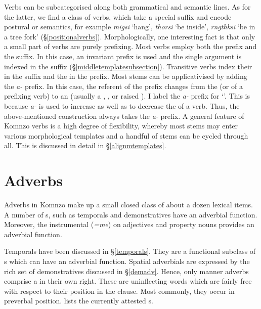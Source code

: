 Verbs can be subcategorised along both grammatical and semantic lines. As for the latter, we find a class of  verbs, which take a special  suffix and encode postural or  semantics, for example \emph{migsi} `hang', \emph{thorsi} `be inside', \emph{rngthksi} `be in a tree fork' (\S{}\ref{positionalverbs}). Morphologically, one interesting fact is that only a small part of  verbs are purely prefixing. Most  verbs employ both the prefix and the suffix. In this case, an invariant  prefix is used and the single argument is indexed in the suffix (\S{}\ref{middletemplatesubsection}). Transitive verbs index their  in the suffix and the  in the prefix. Most stems can be applicativised by adding the \emph{a-} prefix. In this case, the referent of the  prefix changes from the  (or  of a prefixing verb) to an  (usually a , , or raised ). I label the \emph{a-} prefix \Vc{} for `'. This is because \emph{a-} is used to increase as well as to decrease the  of a verb. Thus, the above-mentioned  construction always takes the \emph{a-} prefix. A general feature of Komnzo verbs is a high degree of flexibility, whereby most stems may enter various morphological templates and a handful of stems can be cycled through all. This is discussed in detail in \S{}\ref{alignmtemplates}.

\section{Adverbs} \label{adverbs}

Adverbs in Komnzo make up a small closed class of about a dozen lexical items. A number of s, such as temporals and demonstratives have an adverbial function. Moreover, the instrumental  (\emph{=me}) on adjectives and property nouns provides an adverbial function.%

Temporals have been discussed in \S{}\ref{temporals}. They are a functional subclass of s which can have an adverbial function. Spatial adverbials are expressed by the rich set of demonstratives discussed in \S{}\ref{demadv}. Hence, only manner adverbs comprise a  in their own right. These are uninflecting words which are fairly free with respect to their position in the clause. Most commonly, they occur in preverbal position.  lists the currently attested s.

